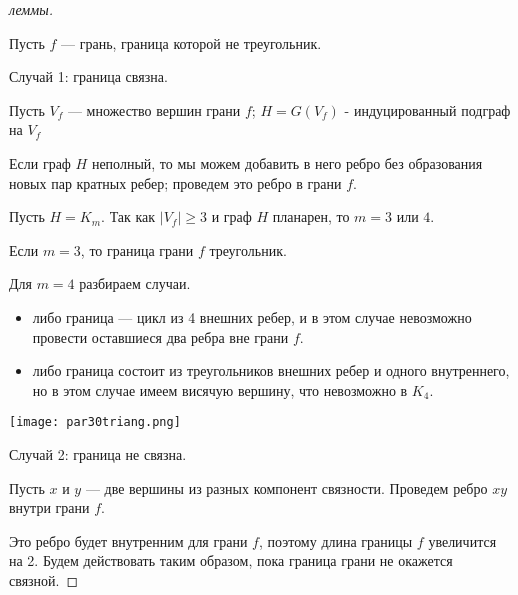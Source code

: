 \begin{proof}[ леммы]~

    Пусть $f$ --- грань, граница которой не треугольник.

    Случай 1: граница связна.

    Пусть $V_f$ --- множество вершин грани $f$; $H = G(V_f)$ - индуцированный подграф на $V_f$

    Если граф $H$ неполный, то мы можем добавить в него ребро без образования новых пар кратных ребер; проведем это ребро в грани $f$.

    Пусть $H = K_m$. Так как $|V_f| \geq 3$ и граф $H$ планарен, то $m = 3$ или $4$.

    Если $m = 3$, то граница грани $f$ треугольник.

    Для $m = 4$ разбираем случаи.

    \begin{itemize}
        \item либо граница --- цикл из 4 внешних ребер, и в этом случае невозможно провести оставшиеся два ребра вне грани $f$.
        \item либо граница состоит из треугольников внешних ребер и одного внутреннего, но в этом случае имеем висячую вершину, что невозможно в $K_4$.
    \end{itemize}
    
    \begin{center}
        \texttt{[image: par30triang.png]}
    \end{center}

    Случай 2: граница не связна.

    Пусть $x$ и $y$ --- две вершины из разных компонент связности. Проведем ребро $xy$ внутри грани $f$.

    Это ребро будет внутренним для грани $f$, поэтому длина границы $f$ увеличится на 2. Будем действовать таким образом, пока граница грани не окажется связной.
\end{proof}


